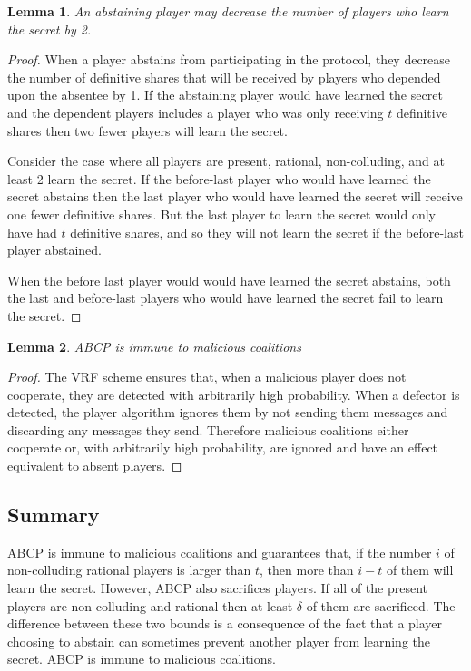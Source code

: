 \documentclass{dalcsthesis}
\newtheorem{lemma}{Lemma}
\begin{document}
\begin{lemma}An abstaining player may decrease the number of players who learn the secret by 2. \label{Lem:ABCP:AbstainBad} \end{lemma}
\begin{proof}
When a player abstains from participating in the protocol, they decrease the number of definitive shares that will be received by players who depended upon the absentee by 1. If the abstaining player would have learned the secret and the dependent players includes a player who was only receiving $t$ definitive shares then two fewer players will learn the secret.

Consider the case where all players are present, rational, non-colluding, and at least 2 learn the secret. If the before-last player who would have learned the secret abstains then the last player who would have learned the secret will receive one fewer definitive shares. But the last player to learn the secret would only have had $t$ definitive shares, and so they will not learn the secret if the before-last player abstained.

When the before last player would would have learned the secret abstains, both the last and before-last players who would have learned the secret fail to learn the secret.
\end{proof}

\begin{lemma} ABCP is immune to malicious coalitions \label{Lem:ABCP:MalImmune} \end{lemma}
\begin{proof}
The VRF scheme ensures that, when a malicious player does not cooperate, they are detected with arbitrarily high probability. When a defector is detected, the player algorithm ignores them by not sending them messages and discarding any messages they send. Therefore malicious coalitions either cooperate or, with arbitrarily high probability, are ignored and have an effect equivalent to absent players.
\end{proof}

\subsection{Summary}

ABCP is immune to malicious coalitions and guarantees that, if the number $i$ of non-colluding rational players is larger than $t$, then more than $i-t$ of them will learn the secret. However, ABCP also sacrifices players. If all of the present players are non-colluding and rational then at least $\delta$ of them are sacrificed. The difference between these two bounds is a consequence of the fact that a player choosing to abstain can sometimes prevent another player from learning the secret. ABCP is immune to malicious coalitions. 
\end{document}
